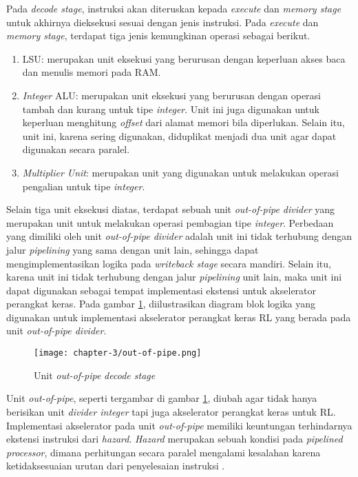 Pada \textit{decode stage}, instruksi akan diteruskan kepada \textit{execute} dan \textit{memory stage} untuk akhirnya dieksekusi sesuai dengan jenis instruksi. Pada \textit{execute} dan \textit{memory stage}, terdapat tiga jenis kemungkinan operasi sebagai berikut.


\begin{enumerate}
	\item \ac{LSU}: merupakan unit eksekusi yang berurusan dengan keperluan akses baca dan menulis memori pada \ac{RAM}.
	\item \textit{Integer} \ac{ALU}: merupakan unit eksekusi yang berurusan dengan operasi tambah dan kurang untuk tipe \textit{integer}. Unit ini juga digunakan untuk keperluan menghitung \textit{offset} dari alamat memori bila diperlukan. Selain itu, unit ini, karena sering digunakan, diduplikat menjadi dua unit agar dapat digunakan secara paralel.
	\item \textit{Multiplier Unit}: merupakan unit yang digunakan untuk melakukan operasi pengalian untuk tipe \textit{integer}.
\end{enumerate}

Selain tiga unit eksekusi diatas, terdapat sebuah unit \textit{out-of-pipe divider} yang merupakan unit untuk melakukan operasi pembagian tipe \textit{integer}. Perbedaan yang dimiliki oleh unit \textit{out-of-pipe divider} adalah unit ini tidak terhubung dengan jalur \textit{pipelining} yang sama dengan unit lain, sehingga dapat mengimplementasikan logika pada \textit{writeback stage} secara mandiri. Selain itu, karena unit ini tidak terhubung dengan jalur \textit{pipelining} unit lain, maka unit ini dapat digunakan sebagai tempat implementasi ekstensi untuk akselerator perangkat keras. Pada gambar \ref{fig:out-of-pipe}, diilustrasikan diagram blok logika yang digunakan untuk implementasi akselerator perangkat keras \ac{RL} yang berada pada unit \textit{out-of-pipe divider}.

\begin{figure}[H]
	\centering
	\texttt{[image: chapter-3/out-of-pipe.png]}
	\caption{Unit \textit{out-of-pipe} \textit{decode stage}}
	\label{fig:out-of-pipe}
\end{figure}

Unit \textit{out-of-pipe}, seperti tergambar di gambar \ref{fig:out-of-pipe}, diubah agar tidak hanya berisikan unit \textit{divider integer} tapi juga akselerator perangkat keras untuk \ac{RL}. Implementasi akselerator pada unit \textit{out-of-pipe} memiliki keuntungan terhindarnya ekstensi instruksi dari \textit{hazard}. \textit{Hazard} merupakan sebuah kondisi pada \textit{pipelined processor}, dimana perhitungan secara paralel mengalami kesalahan karena ketidaksesuaian urutan dari penyelesaian instruksi \parencite{sarah2021digital}.

